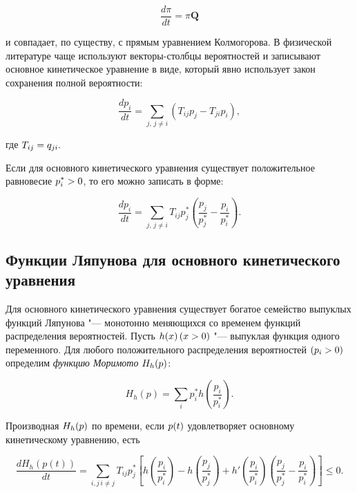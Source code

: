 \documentclass{article}
\begin{document}
\begin{equation*}
	{\frac  {d\pi }{dt}}=\pi {\mathbf  {Q}}
\end{equation*}

и совпадает, по существу, с прямым уравнением Колмогорова. В физической литературе чаще используют векторы-столбцы вероятностей и записывают основное кинетическое уравнение в виде, который явно использует закон сохранения полной вероятности:

\begin{equation*}
	{\frac  {dp_{i}}{dt}}=\sum _{{j,\,j\neq i}}(T_{{ij}}p_{j}-T_{{ji}}p_{i}),
\end{equation*}

где ${\displaystyle T_{ij}=q_{ji}.}$

Если для основного кинетического уравнения существует положительное равновесие ${\displaystyle p_{i}^{*}>0}$, то его можно записать в форме:

\begin{equation*}
	{\frac  {dp_{i}}{dt}}=\sum _{{j,\,j\neq i}}T_{{ij}}p_{j}^{*}\left({\frac  {p_{j}}{p_{j}^{*}}}-{\frac  {p_{i}}{p_{i}^{*}}}\right).
\end{equation*}

\subsection{Функции Ляпунова для основного кинетического уравнения}
Для основного кинетического уравнения существует богатое семейство выпуклых функций Ляпунова "--- монотонно меняющихся со временем функций распределения вероятностей. Пусть ${\displaystyle h(x)\,(x>0)}$ "--- выпуклая функция одного переменного. Для любого положительного распределения вероятностей $({\displaystyle p_{i}>0)}$ определим \textit{функцию Моримото} ${\displaystyle H_{h}(p)}$:

\begin{equation*}
	H_{h}(p)=\sum _{i}p_{i}^{*}h\left({\frac  {p_{i}}{p_{i}^{*}}}\right).
\end{equation*}

Производная ${\displaystyle H_{h}(p)}$ по времени, если ${\displaystyle p(t)}$ удовлетворяет основному кинетическому уравнению, есть

\begin{equation*}
	{\frac  {dH_{h}(p(t))}{dt}}=\sum _{{i,j\,i\neq j}}T_{{ij}}p_{j}^{*}\left[h\left({\frac  {p_{i}}{p_{i}^{*}}}\right)-h\left({\frac  {p_{j}}{p_{j}^{*}}}\right)+h'\left({\frac  {p_{i}}{p_{i}^{*}}}\right)\left({\frac  {p_{j}}{p_{j}^{*}}}-{\frac  {p_{i}}{p_{i}^{*}}}\right)\right]\leq 0.
\end{equation*}
\end{document}
